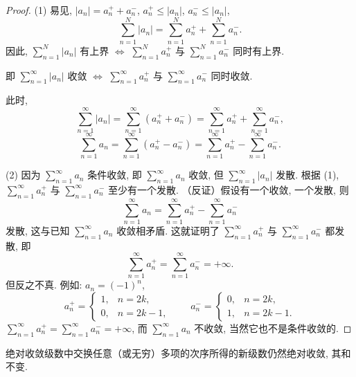 \begin{proof}
(1) 易见, $|a_{n}|=a_{n}^{+}+a_{n}^{-}$, $a_{n}^{+}\leqslant|a_{n}|$, $a_{n}^{-}\leqslant|a_{n}|$,
\[
  \sum_{n=1}^{N}|a_{n}|=\sum_{n=1}^{N}a_{n}^{+}+\sum_{n=1}^{N}a_{n}^{-}.
\]
因此,
$\sum_{n=1}^{N}|a_{n}|$ 有上界 $\Leftrightarrow$ $\sum_{n=1}^{N}a_{n}^{+}$ 与 $\sum_{n=1}^{N}a_{n}^{-}$ 同时有上界.

即
$\sum_{n=1}^{\infty}|a_{n}|$ 收敛 $\Leftrightarrow$ $\sum_{n=1}^{\infty}a_{n}^{+}$ 与 $\sum_{n=1}^{\infty}a_{n}^{-}$ 同时收敛.

此时,
\[
  \sum_{n=1}^{\infty}|a_{n}|=\sum_{n=1}^{\infty}(a_{n}^{+}+a_{n}^{-})
  =\sum_{n=1}^{\infty}a_{n}^{+}+\sum_{n=1}^{\infty}a_{n}^{-},
\]
\[
  \sum_{n=1}^{\infty}a_{n}=\sum_{n=1}^{\infty}(a_{n}^{+}-a_{n}^{-})
  =\sum_{n=1}^{\infty}a_{n}^{+}-\sum_{n=1}^{\infty}a_{n}^{-}.
\]

(2) 因为 $\sum_{n=1}^{\infty}a_{n}$ 条件收敛, 即 $\sum_{n=1}^{\infty}a_{n}$ 收敛, 但 $\sum_{n=1}^{\infty}|a_{n}|$ 发散. 根据 (1), $\sum_{n=1}^{\infty}a_{n}^{+}$ 与 $\sum_{n=1}^{\infty}a_{n}^{-}$ 至少有一个发散. （反证）假设有一个收敛, 一个发散, 则
\[
  \sum_{n=1}^{\infty}a_{n}=\sum_{n=1}^{\infty}a_{n}^{+}-\sum_{n=1}^{\infty}a_{n}^{-}
\]
发散, 这与已知 $\sum_{n=1}^{\infty}a_{n}$ 收敛相矛盾. 这就证明了 $\sum_{n=1}^{\infty}a_{n}^{+}$ 与 $\sum_{n=1}^{\infty}a_{n}^{-}$ 都发散, 即
\[
  \sum_{n=1}^{\infty}a_{n}^{+}=\sum_{n=1}^{\infty}a_{n}^{-}=+\infty.
\]
但反之不真. 例如: $a_{n}=(-1)^{n}$,
\[
  a_{n}^{+}=\left\{\begin{matrix}
    1, & n=2k,\\
    0, & n=2k-1,
  \end{matrix}\right.
  \qquad
  a_{n}^{-}=\left\{\begin{matrix}
    0, & n=2k,\\
    1, & n=2k-1.
  \end{matrix}\right.
\]
$\sum_{n=1}^{\infty}a_{n}^{+}=\sum_{n=1}^{\infty}a_{n}^{-}=+\infty$, 而 $\sum_{n=1}^{\infty}a_{n}$ 不收敛, 当然它也不是条件收敛的.
\end{proof}

\begin{theorem}[绝对收敛级数的特性]\label{thm:12.3.6}
绝对收敛级数中交换任意（或无穷）多项的次序所得的新级数仍然绝对收敛, 其和不变.
\end{theorem}

